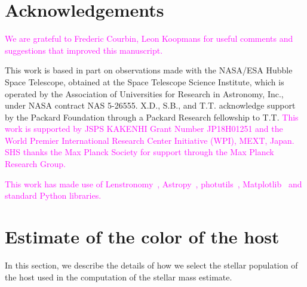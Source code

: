 \documentclass[fleqn,usenatbib]{mnras}
\newcommand{\lenstronomy}{{\sc Lenstronomy}}
\newcommand{\pink}[1]{{\textcolor{magenta}{#1}}}
\begin{document}
\section*{Acknowledgements}
\pink{We are grateful to Frederic Courbin, Leon Koopmans for useful comments
and suggestions that improved this manuscript.}

This work is based in part on observations made with the NASA/ESA Hubble Space Telescope, obtained at the Space Telescope Science Institute, which is operated by the Association of Universities for Research in Astronomy, Inc., under NASA contract NAS 5-26555. X.D., S.B., and T.T. acknowledge support by the Packard Foundation through a Packard Research fellowship to T.T. \pink{This work is supported by JSPS KAKENHI Grant Number JP18H01251 and the World Premier International Research Center Initiative (WPI), MEXT, Japan. SHS thanks the Max Planck Society for support through the Max Planck Research Group.} 

\pink{This work has made use of \lenstronomy~\citep{lenstronomy}, {\sc Astropy}~\citep{Astropy}, {\sc photutils}~\citep{photutils}, {\sc Matplotlib}~\citep{Matplotlib} and standard Python libraries.}









\appendix

\section{Estimate of the color of the host}
In this section, we describe the details of how we select the stellar population of the host used in the computation of the stellar mass estimate.
\end{document}
